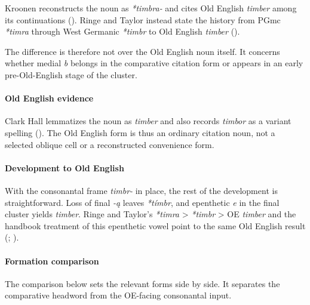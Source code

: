 \documentclass[
  british,
  a4paper,
]{article}
\begin{document}
Kroonen reconstructs the noun as \emph{*timbra-} and cites Old English
\emph{timber} among its continuations
(). Ringe and Taylor
instead state the history from PGmc \emph{*timra} through West Germanic
\emph{*timbr} to Old English \emph{timber}
().

The difference is therefore not over the Old English noun itself. It
concerns whether medial \emph{b} belongs in the comparative citation
form or appears in an early pre-Old-English stage of the cluster.

\paragraph{Old English evidence}\label{old-english-evidence-31}

Clark Hall lemmatizes the noun as \emph{timber} and also records
\emph{timbor} as a variant spelling (). The Old English form is thus an ordinary citation
noun, not a selected oblique cell or a reconstructed convenience form.

\paragraph{Development to Old
English}\label{development-to-old-english-31}

With the consonantal frame \emph{timbr-} in place, the rest of the
development is straightforward. Loss of final \emph{-ą} leaves
\emph{*tímbr}, and epenthetic \emph{e} in the final cluster yields
\emph{timber}. Ringe and Taylor's \emph{*timra} \textgreater{}
\emph{*timbr} \textgreater{} OE \emph{timber} and the handbook treatment
of this epenthetic vowel point to the same Old English result
(;
).

\paragraph{Formation comparison}\label{formation-comparison-6}

The comparison below sets the relevant forms side by side. It separates
the comparative headword from the OE-facing consonantal input.
\end{document}
